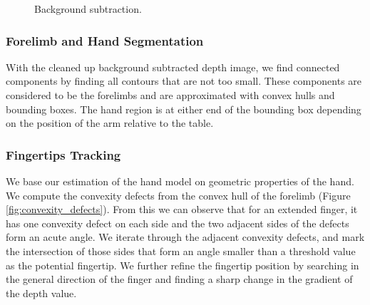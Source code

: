 \begin{figure}[h]
  \centering
  \caption{Background subtraction.} \label{fig:setup}
\end{figure}


\subsubsection{Forelimb and Hand Segmentation}
With the cleaned up background subtracted depth image, we find connected
components by finding all contours that are not too small. These components are
considered to be the forelimbs and are approximated with convex hulls and 
bounding boxes. The hand region is at either end of the bounding box depending
on the position of the arm relative to the table.

\subsubsection{Fingertips Tracking}
We base our estimation of the hand model on geometric properties of the
hand. We compute the convexity defects from the convex hull of the forelimb
(Figure \ref{fig:convexity_defects}). From this we can observe that for an
extended finger, it has one convexity defect on each side and the two adjacent sides of the defects form an
acute angle. We iterate through the adjacent convexity defects, and mark the
intersection of those sides that form an angle smaller than a threshold
value as the potential fingertip. We further refine the fingertip position by
searching in the general direction of the finger and finding a sharp change in
the gradient of the depth value.

